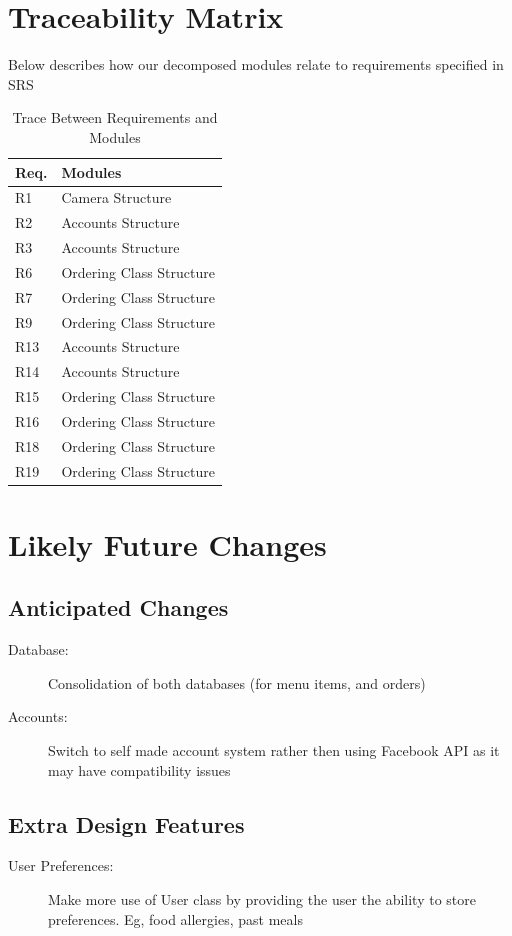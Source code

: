 \documentclass[12pt, titlepage]{article}
\begin{document}
\section{Traceability Matrix}
Below describes how our decomposed modules relate to requirements specified in SRS
\begin{table}[H]
\centering
\begin{tabular}{p{} p{}}
\toprule
\textbf{Req.} & \textbf{Modules}\\
\midrule
R1 & Camera Structure\\
R2 & Accounts Structure\\
R3 & Accounts Structure\\
R6 & Ordering Class Structure\\
R7 & Ordering Class Structure\\
R9 & Ordering Class Structure\\
R13 & Accounts Structure \\
R14 & Accounts Structure\\
R15 & Ordering Class Structure\\
R16 & Ordering Class Structure\\
R18 & Ordering Class Structure\\
R19 & Ordering Class Structure\\
\bottomrule
\end{tabular}
\caption{Trace Between Requirements and Modules}
\label{TblRT}
\end{table}

\section{Likely Future Changes}
\subsection{Anticipated Changes}
\begin{description}
  \item[Database:] Consolidation of both databases (for menu items, and orders)
  \item[Accounts:] Switch to self made account system rather then using Facebook API as it may have compatibility issues
 \end{description}
 
\subsection{Extra Design Features}
\begin{description}
  \item[User Preferences:] Make more use of User class by providing the user the ability to store preferences. Eg, food allergies, past meals
\end{description}
\end{document}
